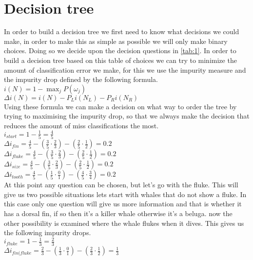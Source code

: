 \documentclass[10pt,a4paper]{article}
\begin{document}
\section{Decision tree}
In order to build a decision tree we first need to know what decisions we could make, in order to make this as simple as possible we will only make binary choices. Doing so we decide upon the decision questions in \ref{tab:1}. 
In order to build a decision tree based on this table of choices we can try to minimize the amount of classification error we make, for this we use the impurity measure and the impurity drop defined by the following formula.\\
$i \left ( N \right ) = 1 - \max _{j} P\left ( \omega _{j} \right )$\\
$\Delta i \left ( N \right ) = i \left ( N \right ) - P_{L}i\left ( N_{L} \right ) - P_{R}i\left ( N_{R} \right )$\\
Using these formula we can make a decision on what way to order the tree by trying to maximising the impurity drop, so that we always make the decision that reduces the amount of miss classifications the most.\\
$i_{start} = 1 - \frac{1}{5} = \frac{4}{5} $\\
$\Delta i_{fin} = \frac{4}{5} - \left ( \frac{3}{5}  \cdot \frac{2}{3} \right ) - \left ( \frac{2}{5} \cdot \frac{1}{2}\right ) = 0.2$\\
$\Delta i_{fluke} = \frac{4}{5} - \left ( \frac{3}{5}  \cdot \frac{2}{3} \right ) - \left ( \frac{2}{5} \cdot \frac{1}{2}\right ) = 0.2$\\
$\Delta i_{size} = \frac{4}{5} - \left ( \frac{3}{5}  \cdot \frac{2}{3} \right ) - \left ( \frac{2}{5} \cdot \frac{1}{2}\right ) = 0.2$\\
$\Delta i_{tooth} = \frac{4}{5} - \left ( \frac{1}{5}  \cdot \frac{0}{1} \right ) - \left ( \frac{4}{5} \cdot \frac{3}{4}\right ) = 0.2$\\
At this point any question can be chosen, but let’s go with the fluke.
This will give us two possible situations lets start with whales that do not show a fluke. In this case only one question will give us more information and that is whether it has a dorsal fin, if so then it's a killer whale otherwise it's a beluga.
now the other possibility is examined where the whale flukes when it dives. This gives us the following impurity drops.\\
$i_{fluke} = 1 - \frac{1}{3} = \frac{2}{3} $\\
$\Delta i_{fin | fluke} = \frac{2}{3} - \left ( \frac{1}{3}  \cdot \frac{0}{1} \right ) - \left ( \frac{2}{3} \cdot \frac{1}{2}\right ) = \frac{1}{3}$\\
\end{document}
